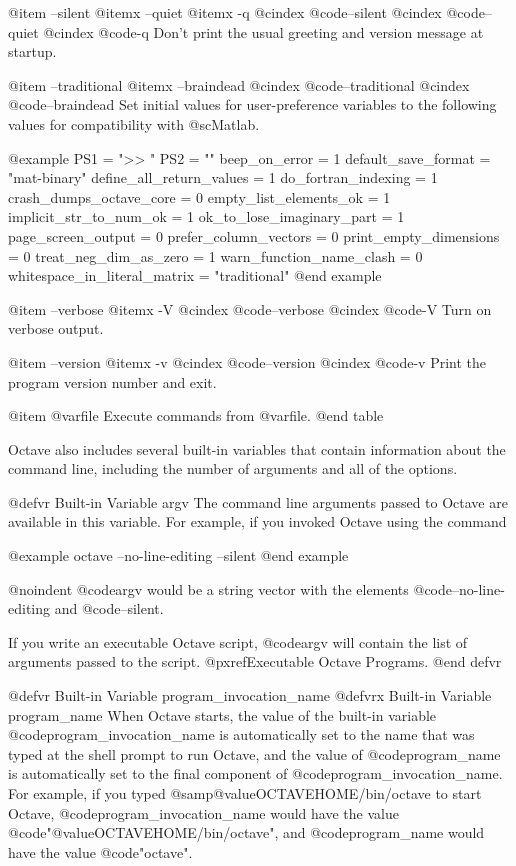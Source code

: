 @item --silent
@itemx --quiet
@itemx -q
@cindex @code{--silent}
@cindex @code{--quiet}
@cindex @code{-q}
Don't print the usual greeting and version message at startup.

@item --traditional
@itemx --braindead
@cindex @code{--traditional}
@cindex @code{--braindead}
Set initial values for user-preference variables to the following
values for compatibility with @sc{Matlab}.

@example
PS1                           = ">> "
PS2                           = ""
beep_on_error                 = 1
default_save_format           = "mat-binary"
define_all_return_values      = 1
do_fortran_indexing           = 1
crash_dumps_octave_core       = 0
empty_list_elements_ok        = 1
implicit_str_to_num_ok        = 1
ok_to_lose_imaginary_part     = 1
page_screen_output            = 0
prefer_column_vectors         = 0
print_empty_dimensions        = 0
treat_neg_dim_as_zero         = 1
warn_function_name_clash      = 0
whitespace_in_literal_matrix  = "traditional"
@end example

@item --verbose
@itemx -V
@cindex @code{--verbose}
@cindex @code{-V}
Turn on verbose output.

@item --version
@itemx -v
@cindex @code{--version}
@cindex @code{-v}
Print the program version number and exit.

@item @var{file}
Execute commands from @var{file}.
@end table

Octave also includes several built-in variables that contain information
about the command line, including the number of arguments and all of the
options.

@defvr {Built-in Variable} argv
The command line arguments passed to Octave are available in this
variable.  For example, if you invoked Octave using the command

@example
octave --no-line-editing --silent
@end example

@noindent
@code{argv} would be a string vector with the elements
@code{--no-line-editing} and @code{--silent}.

If you write an executable Octave script, @code{argv} will contain the
list of arguments passed to the script.  @pxref{Executable Octave Programs}.
@end defvr

@defvr {Built-in Variable} program_invocation_name
@defvrx {Built-in Variable} program_name
When Octave starts, the value of the built-in variable
@code{program_invocation_name} is automatically set to the name that was
typed at the shell prompt to run Octave, and the value of
@code{program_name} is automatically set to the final component of
@code{program_invocation_name}.  For example, if you typed
@samp{@value{OCTAVEHOME}/bin/octave} to start Octave,
@code{program_invocation_name} would have the value
@code{"@value{OCTAVEHOME}/bin/octave"}, and @code{program_name} would
have the value @code{"octave"}.

